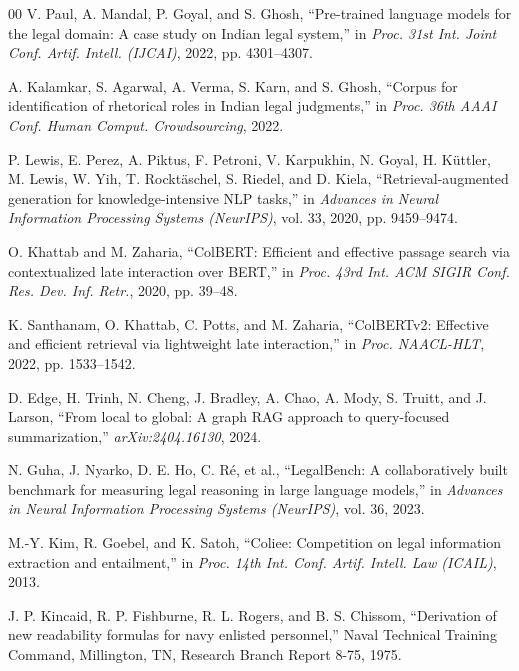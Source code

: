 \documentclass[conference]{IEEEtran}
\begin{document}
\begin{thebibliography}{00}
V. Paul, A. Mandal, P. Goyal, and S. Ghosh, ``Pre-trained language models for the legal domain: A case study on Indian legal system,'' in \textit{Proc. 31st Int. Joint Conf. Artif. Intell. (IJCAI)}, 2022, pp. 4301--4307.

A. Kalamkar, S. Agarwal, A. Verma, S. Karn, and S. Ghosh, ``Corpus for identification of rhetorical roles in Indian legal judgments,'' in \textit{Proc. 36th AAAI Conf. Human Comput. Crowdsourcing}, 2022.

P. Lewis, E. Perez, A. Piktus, F. Petroni, V. Karpukhin, N. Goyal, H. K{\"u}ttler, M. Lewis, W. Yih, T. Rockt{\"a}schel, S. Riedel, and D. Kiela, ``Retrieval-augmented generation for knowledge-intensive NLP tasks,'' in \textit{Advances in Neural Information Processing Systems (NeurIPS)}, vol. 33, 2020, pp. 9459--9474.

O. Khattab and M. Zaharia, ``ColBERT: Efficient and effective passage search via contextualized late interaction over BERT,'' in \textit{Proc. 43rd Int. ACM SIGIR Conf. Res. Dev. Inf. Retr.}, 2020, pp. 39--48.

K. Santhanam, O. Khattab, C. Potts, and M. Zaharia, ``ColBERTv2: Effective and efficient retrieval via lightweight late interaction,'' in \textit{Proc. NAACL-HLT}, 2022, pp. 1533--1542.

D. Edge, H. Trinh, N. Cheng, J. Bradley, A. Chao, A. Mody, S. Truitt, and J. Larson, ``From local to global: A graph RAG approach to query-focused summarization,'' \textit{arXiv:2404.16130}, 2024.

N. Guha, J. Nyarko, D. E. Ho, C. R{\'e}, et al., ``LegalBench: A collaboratively built benchmark for measuring legal reasoning in large language models,'' in \textit{Advances in Neural Information Processing Systems (NeurIPS)}, vol. 36, 2023.

M.-Y. Kim, R. Goebel, and K. Satoh, ``Coliee: Competition on legal information extraction and entailment,'' in \textit{Proc. 14th Int. Conf. Artif. Intell. Law (ICAIL)}, 2013.

J. P. Kincaid, R. P. Fishburne, R. L. Rogers, and B. S. Chissom, ``Derivation of new readability formulas for navy enlisted personnel,'' Naval Technical Training Command, Millington, TN, Research Branch Report 8-75, 1975.


\end{thebibliography}
\end{document}
